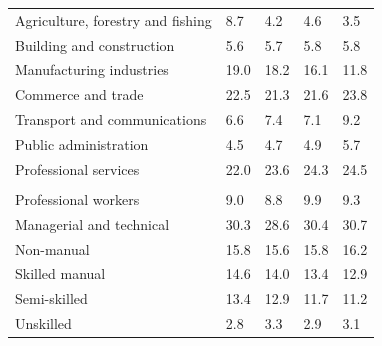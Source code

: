 \documentclass{article}
\begin{document}
\begin{table}[h]
\begin{tabular}{KTTTT}
    \hline
Agriculture, forestry and fishing  & 8.7& 4.2& 4.6& 3.5\\
Building and construction & 5.6& 5.7& 5.8& 5.8\\
Manufacturing industries & 19.0& 18.2& 16.1& 11.8\\
Commerce and trade  & 22.5& 21.3& 21.6& 23.8\\
Transport and communications  & 6.6& 7.4& 7.1& 9.2\\
Public administration & 4.5& 4.7& 4.9& 5.7\\
Professional services & 22.0& 23.6& 24.3& 24.5\\
\hline
    \\ 
    \hline
Professional workers  & 9.0& 8.8 & 9.9& 9.3\\
Managerial and technical & 30.3& 28.6& 30.4& 30.7\\
Non-manual & 15.8& 15.6& 15.8& 16.2\\
Skilled manual & 14.6& 14.0& 13.4& 12.9\\
Semi-skilled & 13.4& 12.9& 11.7& 11.2\\
Unskilled  & 2.8& 3.3& 2.9& 3.1\\
\end{tabular}
\end{table}
\pagebreak
\end{document}
